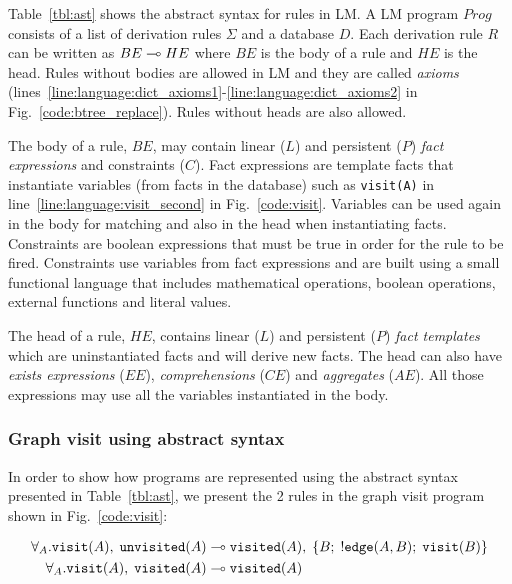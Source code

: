 Table~\ref{tbl:ast} shows the abstract syntax for rules in LM.  A LM program
$Prog$ consists of a list of derivation rules $\Sigma$ and a database $D$.  Each
derivation rule $R$ can be written as $BE \multimap HE$ where $BE$ is the body of a
rule and $HE$ is the head. Rules without bodies are allowed in LM and they are
called \textit{axioms}
(lines~\ref{line:language:dict_axioms1}-\ref{line:language:dict_axioms2} in
Fig.~\ref{code:btree_replace}). Rules without heads are also allowed.

The body of a rule, $BE$, may contain linear ($L$) and persistent ($P$)
\emph{fact expressions} and constraints ($C$). Fact expressions are template
facts that instantiate variables (from facts in the database) such as
\texttt{visit(A)} in line~\ref{line:language:visit_second} in
Fig.~\ref{code:visit}. Variables can be used again in the body for matching and
also in the head when instantiating facts.  Constraints are boolean expressions
that must be true in order for the rule to be fired. Constraints use variables
from fact expressions and are built using a small functional language that
includes mathematical operations, boolean operations, external functions and
literal values.

The head of a rule, $HE$, contains linear ($L$) and persistent ($P$) \emph{fact
templates} which are uninstantiated facts and will derive new facts. The head
can also have \emph{exists expressions} ($EE$), \emph{comprehensions} ($CE$)
and \emph{aggregates} ($AE$). All those expressions may use all the variables
instantiated in the body.

\subsubsection{Graph visit using abstract syntax}\label{visit:ast}

In order to show how programs are represented using the abstract syntax
presented in Table~\ref{tbl:ast}, we present the 2 rules in the graph visit
program shown in Fig.~\ref{code:visit}:

\nopagebreak

\begin{align}
\forall_A. \mathtt{visit}(A), \; \mathtt{unvisited}(A) \multimap & \;
\mathtt{visited}(A), \; \{ B; \; {!} \mathtt{edge}(A, B); \;
\mathtt{visit}(B)\}\\
\forall_A. \mathtt{visit}(A), \; \mathtt{visited}(A) \multimap & \;
\mathtt{visited}(A)
\end{align}

